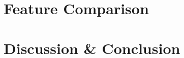 \documentclass[article]{aaltoseries}
\begin{document}
\section{Feature Comparison}\label{sec:feature-comparison}

\section{Discussion \& Conclusion}\label{sec:discussion-conclusion}

\newpage


\end{document}
